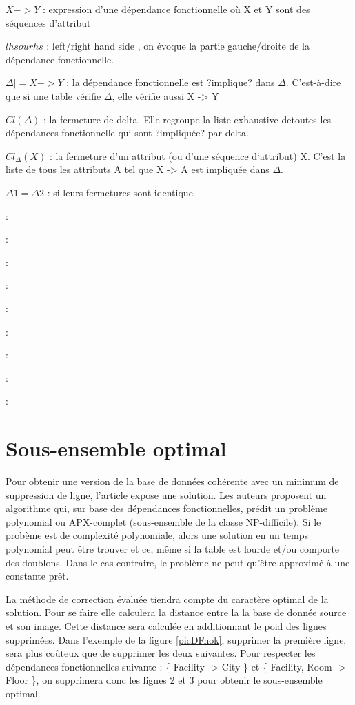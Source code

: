 \documentclass[12pt, a4paper, oneside, titlepage]{book}%
\begin{document}
\begin{description}
\item{$X -> Y$ : } expression d'une dépendance fonctionnelle où X et Y sont des séquences d'attribut
\item{$lhs ou rhs$ : } \fg left/right hand side \og, on évoque la partie gauche/droite de la dépendance fonctionnelle.
\item{$\Delta |= X -> Y$ : } la dépendance fonctionnelle est ?implique? dans $\Delta$. C'est-à-dire que si une table vérifie $\Delta$, elle vérifie aussi X -> Y
\item{$Cl(\Delta)$ : } la fermeture de delta. Elle regroupe la liste exhaustive detoutes les dépendances fonctionnelle qui sont ?impliquée? par delta.
\item{$Cl_\Delta(X)$ : }  la fermeture d’un attribut (ou d’une séquence d‘attribut) X. C’est la liste de tous les attributs A tel que X -> A est impliquée dans $\Delta$.
\item{$\Delta1 = \Delta2$ : } si leurs fermetures sont identique.



\item{ : } 
\item{ : } 
\item{ : } 
\item{ : } 
\item{ : } 
\item{ : } 
\item{ : } 
\item{ : } 
\item{ : } 
\end{description}

\clearpage
\chapter{Sous-ensemble optimal}\label{CHsrepair}
Pour obtenir une version de la base de données cohérente avec un minimum de suppression de ligne, l'article \cite{article} expose une solution. Les auteurs proposent un algorithme qui, sur base des dépendances fonctionnelles, prédit un problème polynomial ou APX-complet (sous-ensemble de la classe NP-difficile). Si le probème est de complexité polynomiale, alors une solution en un temps polynomial peut être trouver et ce, même si la table est lourde et/ou comporte des doublons. Dans le cas contraire, le problème ne peut qu'être approximé à une constante prêt.

La méthode de correction évaluée tiendra compte du caractère optimal de la solution. Pour se faire elle calculera la distance entre la la base de donnée source et son image. Cette distance sera calculée en additionnant le poid des lignes supprimées.
Dans l'exemple de la figure \ref{picDFnok}, supprimer la première ligne, sera plus coûteux que de supprimer les deux suivantes. Pour respecter les dépendances fonctionnelles suivante : \{ Facility -> City \} et \{ Facility, Room -> Floor \}, on supprimera donc les lignes 2 et 3 pour obtenir le sous-ensemble optimal.
\end{document}
